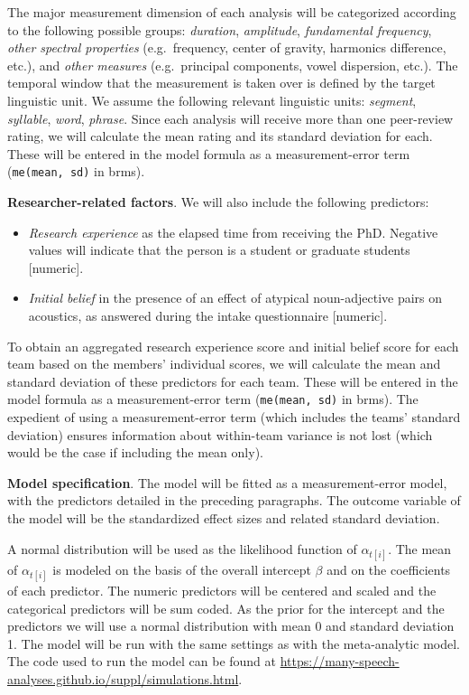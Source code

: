 \documentclass[Review,times,sageh]{sagej}
\providecommand{\tightlist}{\setlength{\itemsep}{0pt}\setlength{\parskip}{0pt}}
\begin{document}
The major measurement dimension of each analysis will be categorized according to the following possible groups: \emph{duration}, \emph{amplitude}, \emph{fundamental frequency}, \emph{other spectral properties} (e.g.~frequency, center of gravity, harmonics difference, etc.), and \emph{other measures} (e.g.~principal components, vowel dispersion, etc.).
The temporal window that the measurement is taken over is defined by the target linguistic unit.
We assume the following relevant linguistic units: \emph{segment}, \emph{syllable}, \emph{word}, \emph{phrase}.
Since each analysis will receive more than one peer-review rating, we will calculate the mean rating and its standard deviation for each.
These will be entered in the model formula as a measurement-error term (\texttt{me(mean,\ sd)} in brms).

\textbf{Researcher-related factors}. We will also include the following predictors:

\begin{itemize}
\tightlist
\item
  \emph{Research experience} as the elapsed time from receiving the PhD. Negative values will indicate that the person is a student or graduate students {[}numeric{]}.
\item
  \emph{Initial belief} in the presence of an effect of atypical noun-adjective pairs on acoustics, as answered during the intake questionnaire {[}numeric{]}.
\end{itemize}

To obtain an aggregated research experience score and initial belief score for each team based on the members' individual scores, we will calculate the mean and standard deviation of these predictors for each team.
These will be entered in the model formula as a measurement-error term (\texttt{me(mean,\ sd)} in brms).
The expedient of using a measurement-error term (which includes the teams' standard deviation) ensures information about within-team variance is not lost (which would be the case if including the mean only).

\textbf{Model specification}. The model will be fitted as a measurement-error model, with the predictors detailed in the preceding paragraphs.
The outcome variable of the model will be the standardized effect sizes and related standard deviation.

A normal distribution will be used as the likelihood function of \(\alpha_{t[i]}\).
The mean of \(\alpha_{t[i]}\) is modeled on the basis of the overall intercept \(\beta\) and on the coefficients of each predictor.
The numeric predictors will be centered and scaled and the categorical predictors will be sum coded.
As the prior for the intercept and the predictors we will use a normal distribution with mean 0 and standard deviation 1.
The model will be run with the same settings as with the meta-analytic model.
The code used to run the model can be found at \url{https://many-speech-analyses.github.io/suppl/simulations.html}.
\end{document}
